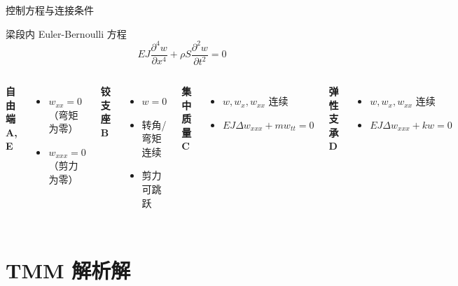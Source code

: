 \documentclass[12pt,aspectratio=169]{ctexbeamer}
\begin{document}
\begin{frame}{控制方程与连接条件}
  \begin{block}{梁段内 Euler-Bernoulli 方程}
    \[
    EJ\frac{\partial^4 w}{\partial x^4} + \rho S\frac{\partial^2 w}{\partial t^2} = 0
    \]
  \end{block}

  \begin{columns}[T]
      \textbf{自由端 A, E}
      \begin{itemize}
        \item $w_{xx}=0$（弯矩为零）
        \item $w_{xxx}=0$（剪力为零）
      \end{itemize}
      \textbf{铰支座 B}
      \begin{itemize}
        \item $w=0$
        \item 转角/弯矩连续
        \item 剪力可跳跃
      \end{itemize}
      \textbf{集中质量 C}
      \begin{itemize}
        \item $w, w_x, w_{xx}$ 连续
        \item $EJ\Delta w_{xxx} + m w_{tt} = 0$
      \end{itemize}
      \textbf{弹性支承 D}
      \begin{itemize}
        \item $w, w_x, w_{xx}$ 连续
        \item $EJ\Delta w_{xxx} + k w = 0$
      \end{itemize}
  \end{columns}
\end{frame}

\section{TMM 解析解}
\end{document}
